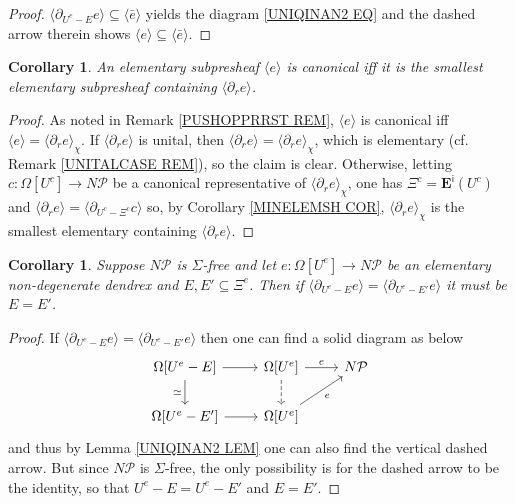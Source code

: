 \documentclass[a4paper,10pt
,draft
]{article}%
\numberwithin{equation}{section}
\numberwithin{figure}{section}
\newtheorem{corollary}[equation]{Corollary}%
\theoremstyle{definition} %
\newcommand{\1}{\ensuremath{\mathbbm 1}}%
\begin{document}
\begin{proof}
	$\langle \partial_{U^e - E} e\rangle
	\subseteq \langle \bar{e} \rangle$
	yields the diagram \eqref{UNIQINAN2 EQ}
	and the dashed arrow therein shows
	$\langle e\rangle
	\subseteq \langle \bar{e} \rangle$.
\end{proof}



\begin{corollary}\label{CANCHAR COR}
	An elementary subpresheaf $\langle e \rangle$
	is canonical iff
	it is the smallest elementary subpresheaf containing
	$\langle \partial_r e \rangle$.
\end{corollary}



\begin{proof}
	As noted in Remark \ref{PUSHOPPRRST REM}, 
	$\langle e \rangle$ is canonical iff
	$\langle e \rangle = \langle \partial_r e \rangle_{\chi}$.
	If $\langle \partial_r e \rangle$ is unital, then 
	$\langle \partial_r e \rangle = \langle \partial_r e \rangle_{\chi}$,
	which is elementary (cf. Remark \ref{UNITALCASE REM}), so the claim is clear.
	Otherwise, letting 
	$c \colon \Omega[U^c] \to N \mathcal{P}$
	be a canonical representative of
	$\langle \partial_r e \rangle_{\chi} $,
	one has
	$\Xi^c = \boldsymbol{E}^{\mathsf{i}}(U^c)$
	and
	$\langle \partial_r e \rangle = 
	\langle \partial_{U^c-\Xi^c} c \rangle$
	so, by Corollary \ref{MINELEMSH COR},
	$\langle \partial_r e \rangle_{\chi} $
	is the smallest elementary containing $\langle \partial_r e \rangle$.
\end{proof}



\begin{corollary}\label{ISODIFCL COR}
	Suppose $N \mathcal{P}$ is $\Sigma$-free
	and let $e \colon \Omega[U^e] \to N \mathcal{P}$
	be an elementary non-degenerate dendrex and
	$E,E' \subseteq \Xi^e$.
	Then if 
	$\langle \partial_{U^e-E} e \rangle
	=
	\langle \partial_{U^e-E'} e \rangle$
	it must be $E = E'$.
\end{corollary}



\begin{proof}
	If 
	$\langle \partial_{U^e-E} e \rangle
	=
	\langle \partial_{U^e-E'} e \rangle$
	then one can find a solid diagram as below
	\[
	\begin{tikzcd}
	\Omega[U^e-E] \ar{d}[swap]{\simeq} \ar{r} &
	\Omega[U^e] \ar{r}{e} \ar[dashed]{d} &
	N \mathcal{P}
	\\
	\Omega[U^e-E'] \ar{r} &
	\Omega[U^e] \ar{ru}[swap]{e} &
	\end{tikzcd}
	\]
	and thus by Lemma \ref{UNIQINAN2 LEM} one can also find the vertical dashed arrow.
	But since $N \mathcal{P}$ is $\Sigma$-free,
	the only possibility is for the dashed arrow to be the identity,
	so that $U^e-E=U^e-E'$ and $E=E'$.
\end{proof}
\end{document}

